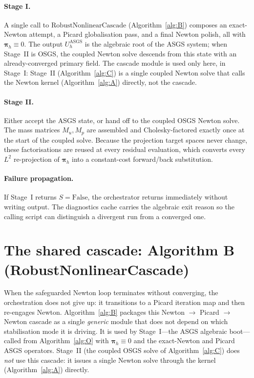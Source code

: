 \documentclass{article}
\begin{document}
\paragraph{Stage I.}  A single call to $\mathrm{RobustNonlinearCascade}$
(Algorithm~\ref{alg:B}) composes an exact-Newton attempt, a Picard
globalisation pass, and a final Newton polish, all with
$\boldsymbol{\pi}_h \equiv 0$. The output $U_h^{\mathrm{ASGS}}$ is the
algebraic root of the ASGS system; when Stage~II is OSGS, the coupled
Newton solve descends from this state with an already-converged
primary field. The cascade module is used only here, in Stage~I:
Stage~II (Algorithm~\ref{alg:C}) is a single coupled Newton solve that
calls the Newton kernel (Algorithm~\ref{alg:A}) directly, not the
cascade.

\paragraph{Stage II.}  Either accept the ASGS state, or hand off to the
coupled OSGS Newton solve. The mass matrices $M_u, M_p$ are assembled
and Cholesky-factored exactly once at the start of the coupled solve. Because the
projection target spaces never change, these factorisations are reused at
every residual evaluation, which converts every $L^2$ re-projection of
$\boldsymbol{\pi}_h$ into a constant-cost forward/back substitution.

\paragraph{Failure propagation.}  If Stage~I returns $S = \mathrm{False}$,
the orchestrator returns immediately without writing output. The
diagnostics cache carries the algebraic exit reason so the calling
script can distinguish a divergent run from a converged one.

\section{The shared cascade: Algorithm B (RobustNonlinearCascade)}
\label{sec:picard}

When the safeguarded Newton loop terminates without converging, the
orchestration does not give up: it transitions to a Picard iteration
map and then re-engages Newton. Algorithm~\ref{alg:B} packages this
Newton $\to$ Picard $\to$ Newton cascade as a single \emph{generic}
module that does not depend on which stabilisation mode it is driving.
It is used by Stage~I---the ASGS algebraic boot---called from
Algorithm~\ref{alg:O} with $\boldsymbol{\pi}_h \equiv 0$ and the
exact-Newton and Picard ASGS operators. Stage~II (the coupled OSGS solve
of Algorithm~\ref{alg:C}) does \emph{not} use this cascade: it issues a
single Newton solve through the kernel (Algorithm~\ref{alg:A}) directly.
\end{document}
